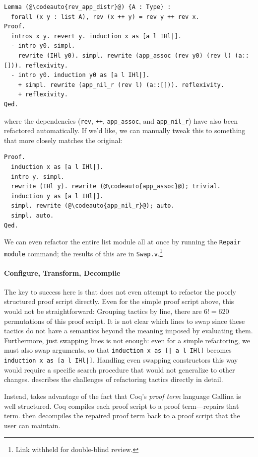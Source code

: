 \begin{lstlisting}
Lemma (@\codeauto{rev_app_distr}@) {A : Type} :
  forall (x y : list A), rev (x ++ y) = rev y ++ rev x.
Proof.
  intros x y. revert y. induction x as [a l IHl|].
  - intro y0. simpl.
    rewrite (IHl y0). simpl. rewrite (app_assoc (rev y0) (rev l) (a::[])). reflexivity.
  - intro y0. induction y0 as [a l IHl|].
    + simpl. rewrite (app_nil_r (rev l) (a::[])). reflexivity.
    + reflexivity.
Qed.
\end{lstlisting}
where the dependencies (\lstinline{rev}, \lstinline{++}, \lstinline{app_assoc}, and \lstinline{app_nil_r}) have
also been refactored automatically.
If we'd like, we can manually tweak this to something that more closely matches the original:

\begin{lstlisting}
Proof.
  induction x as [a l IHl|].
  intro y. simpl.
  rewrite (IHl y). rewrite (@\codeauto{app_assoc}@); trivial.
  induction y as [a l IHl|].
  simpl. rewrite (@\codeauto{app_nil_r}@); auto.
  simpl. auto.
Qed.
\end{lstlisting}
We can even refactor the entire list module all at once by running the \lstinline{Repair module}
command; the results of this are in \lstinline{Swap.v}.\footnote{Link withheld for double-blind review.} %

\paragraph{Configure, Transform, Decompile}
The key to success here is that \toolname does not even attempt to refactor the poorly structured proof script directly.
Even for the simple proof script above, this would not be straightforward: Grouping tactics by line, there are $6! = 620$
permutations of this proof script.
It is not clear which lines to swap since these tactics do not have a semantics beyond the meaning imposed by evaluating them.
Furthermore, just swapping lines is not enough: even for a simple refactoring, we must also swap
arguments, so that \lstinline{induction x as [| a l IHl]} becomes \lstinline{induction x as [a l IHl|]}.
Handling even swapping constructors this way would require a specific search procedure that would not generalize to other changes.
\citep{robert2018} describes the challenges of refactoring tactics directly in detail.

Instead, \toolname takes advantage of the fact that Coq's \textit{proof term} language Gallina is well structured.
Coq compiles each proof script to a proof term---\toolname repairs that term.
\toolname then decompiles the repaired proof term back to a proof script that the user can maintain.

